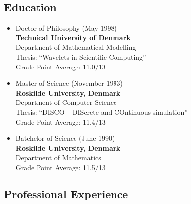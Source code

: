 \documentclass[12pt,a4paper]{article}
\begin{document}
\subsection*{Education}

\begin{itemize}
\item Doctor of Philosophy (May 1998) \\
{\bf Technical University of Denmark} \\ 
Department of Mathematical Modelling  \\
Thesis: ``Wavelets in Scientific Computing''\\ 
Grade Point Average: 11.0/13    %

\item  Master of Science (November 1993) \\
{\bf Roskilde University, Denmark} \\
Department of Computer Science \\ 
Thesis: ``DISCO -- DIScrete and COntinuous simulation''\\ 
Grade Point Average: 11.4/13  %

\item  Batchelor of Science (June 1990) \\
{\bf Roskilde University, Denmark} \\
Department of Mathematics \\ 
Grade Point Average: 11.5/13  %
\end{itemize}

\newpage
\subsection*{Professional Experience}
\end{document}
